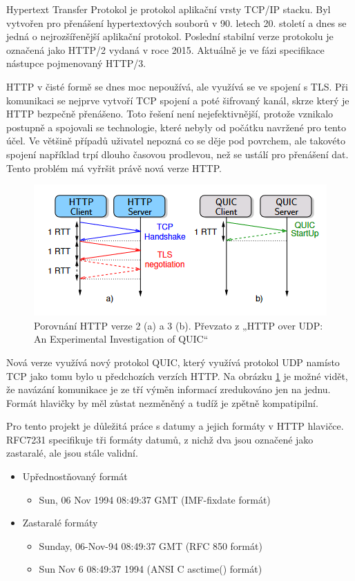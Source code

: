 Hypertext Transfer Protokol je protokol aplikační vrsty TCP/IP stacku. Byl vytvořen pro přenášení hypertextových souborů v 90. letech 20. století a dnes se jedná o
nejrozšířenější aplikační protokol. Poslední stabilní verze protokolu je označená jako HTTP/2 vydaná v roce 2015. Aktuálně je ve fázi specifikace nástupce pojmenovaný HTTP/3.

HTTP v čisté formě se dnes moc nepoužívá, ale využívá se ve spojení s TLS. Při komunikaci se nejprve vytvoří TCP spojení a poté šifrovaný kanál, skrze který je HTTP
bezpečně přenášeno. Toto řešení není nejefektivnější, protože vznikalo postupně a spojovali se technologie, které nebyly od počátku navržené pro tento účel. Ve většině případů
uživatel nepozná co se děje pod povrchem, ale takovéto spojení například trpí dlouho časovou prodlevou, než se ustálí pro přenášení dat. Tento problém má vyřršit právě nová
verze HTTP.\cite{HTTP3}

\begin{figure}[h]
    \centering
    \includegraphics[width=0.8\linewidth]{other-fig/http_comparison.png}
    \caption{Porovnání HTTP verze 2 (a) a 3 (b). Převzato z „HTTP over UDP: An Experimental Investigation of QUIC“\cite{HTTP3}}
    \label{fig:http_comparison}
\end{figure}

Nová verze využívá nový protokol QUIC, který využívá protokol UDP namísto TCP jako tomu bylo u předchozích verzích HTTP. Na obrázku \ref{fig:http_comparison} je možné vidět,
že navázání komunikace je ze tří výměn informací zredukováno jen na jednu. Formát hlavičky by měl zůstat nezměněný a tudíž je zpětně kompatipilní.

Pro tento projekt je důležitá práce s datumy a jejich formáty v HTTP hlavičce. RFC7231 specifikuje tři formáty datumů, z nichž dva jsou označené jako zastaralé,
ale jsou stále validní.\cite{RFC7231}

\begin{itemize}
    \item Upřednostňovaný formát
    \begin{itemize}
        \item Sun, 06 Nov 1994 08:49:37 GMT (IMF-fixdate formát)
    \end{itemize}
    \item Zastaralé formáty
    \begin{itemize}
        \item Sunday, 06-Nov-94 08:49:37 GMT (RFC 850 formát)
        \item Sun Nov  6 08:49:37 1994 (ANSI C asctime() formát)
    \end{itemize}
\end{itemize}

